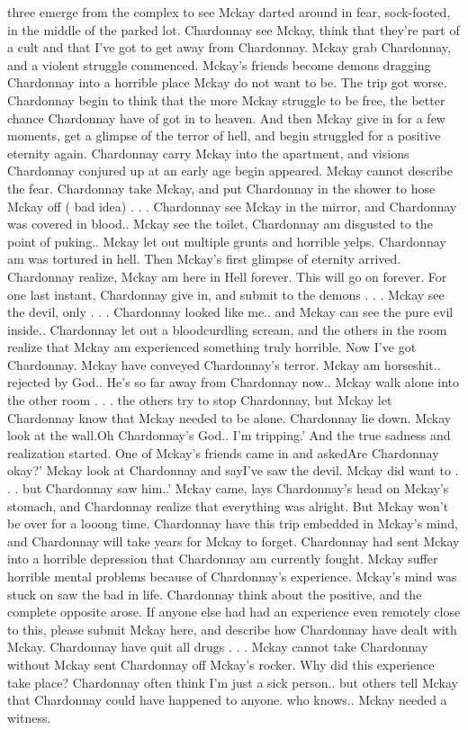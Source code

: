 \documentclass[12pt]{book}
\begin{document}
three emerge from the complex to see Mckay darted around in fear, sock-footed, in the middle of the parked lot. Chardonnay see Mckay, think that they're part of a cult and that I've got to get away from Chardonnay. Mckay grab Chardonnay, and a violent struggle commenced. Mckay's friends become demons dragging Chardonnay into a horrible place Mckay do not want to be. The trip got worse. Chardonnay begin to think that the more Mckay struggle to be free, the better chance Chardonnay have of got in to heaven. And then Mckay give in for a few moments, get a glimpse of the terror of hell, and begin struggled for a positive eternity again. Chardonnay carry Mckay into the apartment, and visions Chardonnay conjured up at an early age begin appeared. Mckay cannot describe the fear. Chardonnay take Mckay, and put Chardonnay in the shower to hose Mckay off ( bad idea) . . .  Chardonnay see Mckay in the mirror, and Chardonnay was covered in blood.. Mckay see the toilet, Chardonnay am disgusted to the point of puking.. Mckay let out multiple grunts and horrible yelps. Chardonnay am was tortured in hell. Then Mckay's first glimpse of eternity arrived. Chardonnay realize, Mckay am here in Hell forever. This will go on forever. For one last instant, Chardonnay give in, and submit to the demons . . .  Mckay see the devil, only . . .  Chardonnay looked like me.. and Mckay can see the pure evil inside.. Chardonnay let out a bloodcurdling scream, and the others in the room realize that Mckay am experienced something truly horrible. Now I've got Chardonnay. Mckay have conveyed Chardonnay's terror. Mckay am horseshit.. rejected by God.. He's so far away from Chardonnay now.. Mckay walk alone into the other room . . .  the others try to stop Chardonnay, but Mckay let Chardonnay know that Mckay needed to be alone. Chardonnay lie down. Mckay look at the wall.Oh Chardonnay's God.. I'm tripping.' And the true sadness and realization started. One of Mckay's friends came in and askedAre Chardonnay okay?' Mckay look at Chardonnay and sayI've saw the devil. Mckay did want to . . .  but Chardonnay saw him..' Mckay came, lays Chardonnay's head on Mckay's stomach, and Chardonnay realize that everything was alright. But Mckay won't be over for a looong time. Chardonnay have this trip embedded in Mckay's mind, and Chardonnay will take years for Mckay to forget. Chardonnay had sent Mckay into a horrible depression that Chardonnay am currently fought. Mckay suffer horrible mental problems because of Chardonnay's experience. Mckay's mind was stuck on saw the bad in life. Chardonnay think about the positive, and the complete opposite arose. If anyone else had had an experience even remotely close to this, please submit Mckay here, and describe how Chardonnay have dealt with Mckay. Chardonnay have quit all drugs . . .  Mckay cannot take Chardonnay without Mckay sent Chardonnay off Mckay's rocker. Why did this experience take place? Chardonnay often think I'm just a sick person.. but others tell Mckay that Chardonnay could have happened to anyone. who knows.. Mckay needed a witness.
\end{document}
